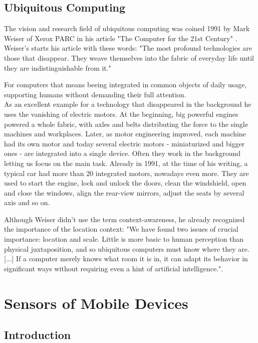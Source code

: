 \subsection{Ubiquitous Computing}

The vision and research field of ubiquitous computing was coined 1991 by Mark Weiser of Xerox PARC in his article "The Computer for the 21st Century" \cite{weiserm1991}. 
Weiser's starts his article with these words:
"The most profound technologies are those that disappear. They weave themselves into the fabric of everyday life until they are indistinguishable from it."

For computers that means beeing integrated in common objects of daily usage, supporting humans without demanding their full attention. \\
As an excellent example for a technology that disappeared in the background he uses the vanishing of electric motors. At the beginning, big powerful engines powered a whole fabric, with axles and belts distributing the force to the single machines and workplaces. Later, as motor engineering improved, each machine had its own motor and today several electric motors - miniaturized and bigger ones - are integrated into a single device. Often they work in the background letting us focus on the main task. Already in 1991, at the time of his writing, a typical car had more than 20 integrated motors, nowadays even more. They are used to start the engine, lock and unlock the doors, clean the windshield, open and close the windows, align the rear-view mirrors, adjust the seats by several axis and so on. 

Although Weiser didn't use the term context-awareness, he already recognized the importance of the location context: "We have found two issues of crucial importance: location and scale. Little is more basic to human perception than physical juxtaposition, and so ubiquitous computers must know where they are. [...] If a computer merely knows what room it is in, it can adapt its behavior in significant ways without requiring even a hint of artificial intelligence.".

\section{Sensors of Mobile Devices}

\subsection{Introduction}

